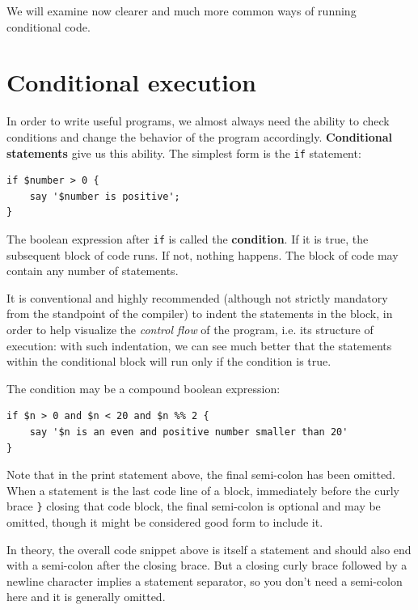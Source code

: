 We will examine now clearer and much more common 
ways of running conditional code.


\section{Conditional execution}
\label{conditional.execution}

In order to write useful programs, we almost always need the ability
to check conditions and change the behavior of the program
accordingly.  {\bf Conditional statements} give us this ability.  The
simplest form is the {\tt if} statement:

\begin{verbatim}
if $number > 0 {
    say '$number is positive';
}
\end{verbatim}
%
The boolean expression after {\tt if} is called the 
{\bf condition}.  If it is true, the subsequent 
block of code runs.  If not, nothing happens. The block of 
code may contain any number of statements.

It is conventional and highly recommended (although not 
strictly mandatory from the standpoint of the compiler) 
to indent the statements in the block, in order to help 
visualize the \emph{control flow} of the program, i.e. 
its structure of execution: with such indentation, we 
can see much better that the statements within the 
conditional block will run only if the condition is true.

The condition may be a compound boolean expression:
\begin{verbatim}
if $n > 0 and $n < 20 and $n %% 2 {
    say '$n is an even and positive number smaller than 20'
}
\end{verbatim}
%
Note that in the print statement above, the final semi-colon 
has been omitted. When a statement is the last code line of 
a block, immediately before the curly brace {\tt \}} closing 
that code block, the final semi-colon is optional and may 
be omitted, though it might be considered good form to include it.

In theory, the overall code snippet above is itself a statement 
and should also end with a semi-colon after the closing brace. 
But a closing curly brace followed by a newline character implies a statement separator, so you don't need a semi-colon here and it is generally omitted.



